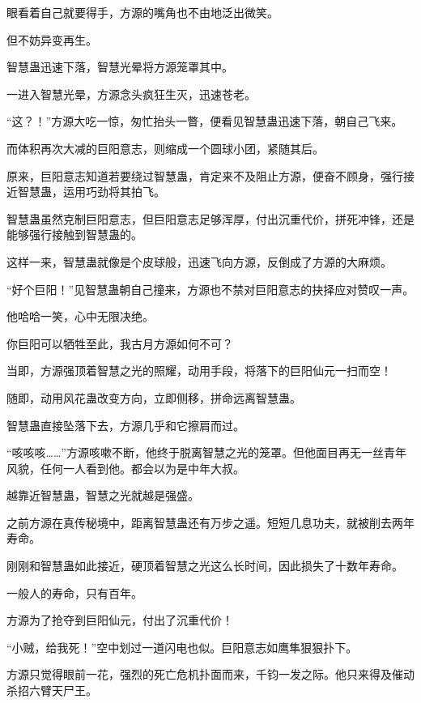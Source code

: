 
\begin{this_body}



眼看着自己就要得手，方源的嘴角也不由地泛出微笑。

但不妨异变再生。

智慧蛊迅速下落，智慧光晕将方源笼罩其中。

一进入智慧光晕，方源念头疯狂生灭，迅速苍老。

“这？！”方源大吃一惊，匆忙抬头一瞥，便看见智慧蛊迅速下落，朝自己飞来。

而体积再次大减的巨阳意志，则缩成一个圆球小团，紧随其后。

原来，巨阳意志知道若要绕过智慧蛊，肯定来不及阻止方源，便奋不顾身，强行接近智慧蛊，运用巧劲将其拍飞。

智慧蛊虽然克制巨阳意志，但巨阳意志足够浑厚，付出沉重代价，拼死冲锋，还是能够强行接触到智慧蛊的。

这样一来，智慧蛊就像是个皮球般，迅速飞向方源，反倒成了方源的大麻烦。

“好个巨阳！”见智慧蛊朝自己撞来，方源也不禁对巨阳意志的抉择应对赞叹一声。

他哈哈一笑，心中无限决绝。

你巨阳可以牺牲至此，我古月方源如何不可？

当即，方源强顶着智慧之光的照耀，动用手段，将落下的巨阳仙元一扫而空！

随即，动用风花蛊改变方向，立即侧移，拼命远离智慧蛊。

智慧蛊直接坠落下去，方源几乎和它擦肩而过。

“咳咳咳……”方源咳嗽不断，他终于脱离智慧之光的笼罩。但他面目再无一丝青年风貌，任何一人看到他。都会以为是中年大叔。

越靠近智慧蛊，智慧之光就越是强盛。

之前方源在真传秘境中，距离智慧蛊还有万步之遥。短短几息功夫，就被削去两年寿命。

刚刚和智慧蛊如此接近，硬顶着智慧之光这么长时间，因此损失了十数年寿命。

一般人的寿命，只有百年。

方源为了抢夺到巨阳仙元，付出了沉重代价！

“小贼，给我死！”空中划过一道闪电也似。巨阳意志如鹰隼狠狠扑下。

方源只觉得眼前一花，强烈的死亡危机扑面而来，千钧一发之际。他只来得及催动杀招六臂天尸王。


\end{this_body}
